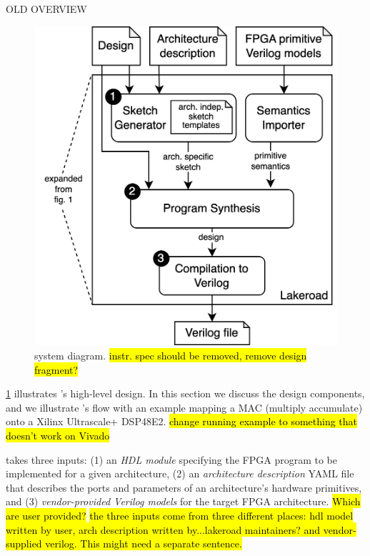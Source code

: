 {\Large OLD OVERVIEW}

\begin{figure}
    \centering
    \includegraphics[width=.8\columnwidth]{assets/lakeroad-diagram.drawio.png}
    \caption{\lr system diagram. \hl{instr. spec should be removed, remove design fragment?}}
    \label{fig:lakeroad-diagram}
\end{figure}
  
\cref{fig:lakeroad-diagram}
  illustrates \lr's high-level design.
In this section we discuss the design components,
  and we illustrate \lr's flow with
  an example mapping a MAC (multiply accumulate) onto
  a Xilinx Ultrascale+ DSP48E2.
\hl{change running example to something that doesn't work on Vivado}
  
\lr takes three inputs:
  (1) an \textit{HDL module} specifying
    the FPGA program 
    to be implemented
    for a given architecture,
  (2) an \textit{architecture description} YAML file
    that describes the ports and parameters
    of an architecture's 
    hardware primitives,
  and (3) \textit{vendor-provided Verilog models}
    for the target FPGA architecture.
\hl{Which are user provided?}
\hl{the three inputs come from three different places: hdl model written by user, arch description written by...lakeroad maintainers? and vendor-supplied verilog. This might need a separate sentence.}

